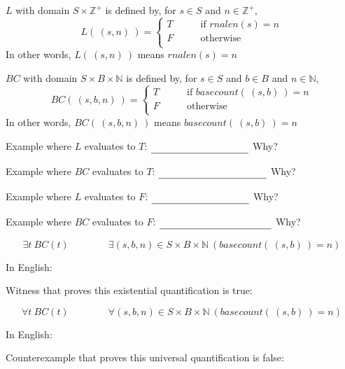 

$L$ with domain $S \times \mathbb{Z}^+$ is defined by, for $s \in S$ and $n \in \mathbb{Z}^+$,
\[
L( ~(s, n)~) = \begin{cases}
T &\qquad\text{if $rnalen(s) = n$}\\
F &\qquad\text{otherwise}\\
\end{cases}
\]
In other words, $L(~(s,n)~)$ means $rnalen(s) = n$

\vfill

$BC$ with domain $S \times B \times \mathbb{N}$ is defined by, 
for $s \in S$ and $b \in B$ and $n \in \mathbb{N}$,
\[
BC(~(s, b, n)~) = \begin{cases}
T &\qquad\text{if $basecount(~(s,b)~) = n$}\\
F &\qquad\text{otherwise}\\
\end{cases}
\]
In other words, $BC(~(s,b,n)~)$ means $basecount(~(s,b)~) = n$

\vfill


Example where $L$ evaluates to $T$: $\underline{\phantom{(\A, 1)\hspace{1in}}}$  Why?

\vfill


Example where $BC$ evaluates to $T$: $\underline{\phantom{(\A, \A1)\hspace{1in}}}$  Why?

\vfill


Example where $L$ evaluates to $F$: $\underline{\phantom{(\A, 2)\hspace{1in}}}$ Why?

\vfill


Example where $BC$ evaluates to $F$: $\underline{\phantom{(\A, \C, 1)\hspace{1in}}}$ Why? 

\vfill

\[\exists t ~BC(t) \qquad \qquad 
\exists (s,b,n) \in S \times B \times \mathbb{N}~ (basecount(~(s,b)~) = n)\]

In English: \phantom{There exists an ordered $3$-tuple 
at which the predicate $BC$ evaluates to $T$.}

\vspace{30pt}

Witness that proves this existential quantification is true:\phantom{$(\G\G, \G, 2)$ or $(\G\A\U\G, \G, 2)$)}

\[\forall t ~BC(t) \qquad \qquad 
\forall(s,b,n) \in S \times B \times \mathbb{N} ~(basecount(~(s,b)~) = n)\]

In English:\phantom{For all ordered $3$-tuples
the predicate $BC$ evaluates to $T$.}

\vspace{30pt}

Counterexample that proves this universal quantification is false: \phantom{$(\G\G, \A, 2)$ or $(\G\A\U\G, \G, 3)$)}
